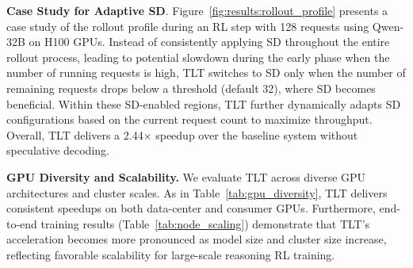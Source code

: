 \documentclass[sigplan,screen]{acmart}
\newcommand{\SysName}{\textrm{TLT}\xspace}
\begin{document}
\noindent\textbf{Case Study for Adaptive SD}.
Figure~\ref{fig:results:rollout_profile} presents a case study of the rollout profile during an RL step with 128 requests using Qwen-32B on H100 GPUs. Instead of consistently applying SD throughout the entire rollout process, leading to potential slowdown during the early phase when the number of running requests is high, \SysName switches to SD only when the number of remaining requests drops below a threshold (default 32), where SD becomes beneficial. Within these SD-enabled regions, \SysName further dynamically adapts SD configurations based on the current request count to maximize throughput. Overall, \SysName delivers a 2.44$\times$ speedup over the baseline system without speculative decoding.

\noindent\textbf{GPU Diversity and Scalability.} 
We evaluate \SysName across diverse GPU architectures and cluster scales. As in Table~\ref{tab:gpu_diversity}, \SysName delivers consistent speedups on both data-center and consumer GPUs. Furthermore, end-to-end training results (Table~\ref{tab:node_scaling}) demonstrate that \SysName's acceleration becomes more pronounced as model size and cluster size increase, reflecting favorable scalability for large-scale reasoning RL training.


\begin{table}[t]
\centering
\caption{\textbf{Rollout throughput (tokens/s) and speedup across GPU types }(Qwen2.5-7B, BS=1, TP=1).}
\label{tab:gpu_diversity}
\vspace{-10pt}
\end{table}

\begin{table}[t]
\centering
\caption{\textbf{End-to-end training speed across GPU scales.}}
\label{tab:node_scaling}
\end{table}
\end{document}
